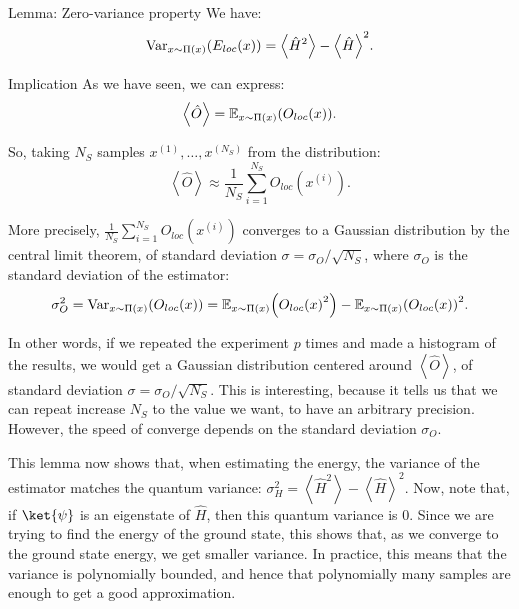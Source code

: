 \documentclass[a4paper]{article}
\begin{document}
\begin{parag}{Lemma: Zero-variance property}
    We have: 
    \[\Var_{x \followsdistr \Pi\left(x\right)}\left(E_{loc}\left(x\right)\right) = \left\langle \hat{H}^2 \right\rangle - \left\langle \hat{H} \right\rangle^2.\]
    
    \begin{subparag}{Implication}
        As we have seen, we can express:
        \[\left\langle \hat{O} \right\rangle = \exval_{x \followsdistr \Pi\left(x\right)}\left(O_{loc}\left(x\right)\right).\]
        
        So, taking $N_S$ samples $x^{\left(1\right)}, \ldots, x^{\left(N_S\right)}$ from the distribution: 
        \[\left\langle \hat{O} \right\rangle \approx \frac{1}{N_S} \sum_{i=1}^{N_S} O_{loc}\left(x^{\left(i\right)}\right).\]

        More precisely, $\frac{1}{N_S} \sum_{i=1}^{N_S} O_{loc}\left(x^{\left(i\right)}\right)$ converges to a Gaussian distribution by the central limit theorem, of standard deviation $\sigma = \sigma_O/\sqrt{N_S}$, where $\sigma_O$ is the standard deviation of the estimator: 
        \[\sigma_O^2 = \Var_{x \followsdistr \Pi\left(x\right)}\left(O_{loc}\left(x\right)\right) = \exval_{x \followsdistr \Pi\left(x\right)}\left(O_{loc}\left(x\right)^2\right) - \exval_{x \followsdistr \Pi\left(x\right)}\left(O_{loc}\left(x\right)\right)^2.\]

        In other words, if we repeated the experiment $p$ times and made a histogram of the results, we would get a Gaussian distribution centered around $\left\langle \hat{O} \right\rangle$, of standard deviation $\sigma = \sigma_O/\sqrt{N_S}$. This is interesting, because it tells us that we can repeat increase $N_S$ to the value we want, to have an arbitrary precision. However, the speed of converge depends on the standard deviation $\sigma_O$.

        This lemma now shows that, when estimating the energy, the variance of the estimator matches the quantum variance: $\sigma_H^2 = \left\langle \hat{H}^2 \right\rangle - \left\langle \hat{H} \right\rangle^2$. Now, note that, if $\ket{\psi}$ is an eigenstate of $\hat{H}$, then this quantum variance is $0$. Since we are trying to find the energy of the ground state, this shows that, as we converge to the ground state energy, we get smaller variance. In practice, this means that the variance is polynomially bounded, and hence that polynomially many samples are enough to get a good approximation.
    \end{subparag}


\end{parag}
\end{document}
